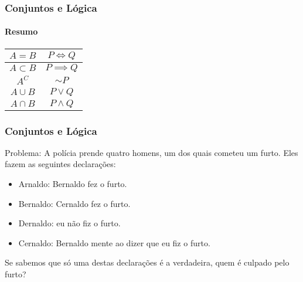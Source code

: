 \begin{frame}
\frametitle{Conjuntos e Lógica} \framesubtitle{Resumo}
\begin{center}
\begin{tabular}{|c|c|}
	\hline
	$A=B$ & $P \iff Q$ \\ \hline
	$A \subset B$ & $P \implies Q$ \\ \hline
	$A^C$ & $\sim P$ \\ \hline
	$A \cup B$ & $P \lor Q$ \\ \hline
	$A \cap B$ & $P \land Q$ \\
	\hline
\end{tabular}
\end{center}
\end{frame}

\begin{frame}
\frametitle{Conjuntos e Lógica} %
Problema: A
polícia prende quatro homens, um dos quais cometeu um furto. Eles fazem
as seguintes declarações:
\begin{itemize}
	\item Arnaldo: Bernaldo fez o furto.
	\item Bernaldo: Cernaldo fez o furto.
	\item Dernaldo: eu não fiz o furto.
	\item Cernaldo: Bernaldo mente ao dizer que eu fiz o furto.
\end{itemize}
Se sabemos que só uma destas declarações é a verdadeira, quem é
culpado pelo furto?

\end{frame}
